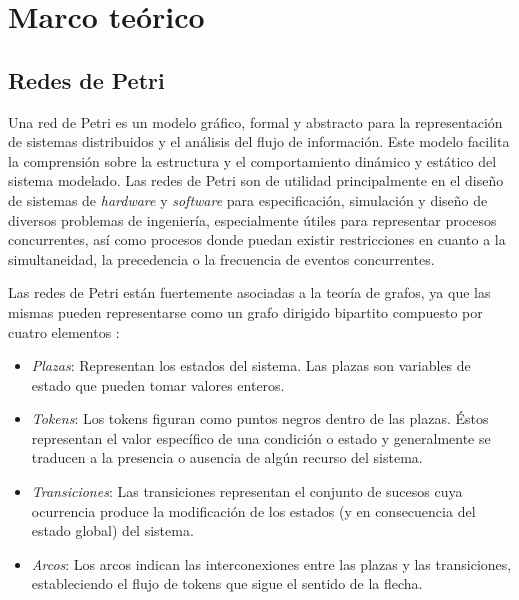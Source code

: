 \chapter{Marco teórico} %

\label{Chapter2} %

\section{Redes de Petri} \label{sec:rdp}

Una red de Petri es un modelo gráfico, formal y abstracto para la representación de sistemas distribuidos y el análisis del flujo de información. Este modelo facilita la comprensión sobre la estructura y el comportamiento dinámico y estático del sistema modelado. Las redes de Petri son de utilidad principalmente en el diseño de sistemas de \textit{hardware} y \textit{software} para especificación, simulación y diseño de diversos problemas de ingeniería, especialmente útiles para representar procesos concurrentes, así como procesos donde puedan existir restricciones en cuanto a la simultaneidad, la precedencia o la frecuencia de eventos concurrentes. \cite{brams}

Las redes de Petri están fuertemente asociadas a la teoría de grafos, ya que las mismas pueden representarse como un grafo dirigido bipartito compuesto por cuatro elementos \cite{libropopn}:
\begin{itemize}
    \item \textit{Plazas}: Representan los estados del sistema. Las plazas son variables de estado que pueden tomar valores enteros.
    \item \textit{Tokens}: Los tokens figuran como puntos negros dentro de las plazas. Éstos representan el valor específico de una condición o estado y generalmente se traducen a la presencia o ausencia de algún recurso del sistema.
    \item \textit{Transiciones}: Las transiciones representan el conjunto de sucesos cuya ocurrencia produce la modificación de los estados (y en consecuencia del estado global) del sistema.
    \item \textit{Arcos}: Los arcos indican las interconexiones entre las plazas y las transiciones, estableciendo el flujo de tokens que sigue el sentido de la flecha.
\end{itemize}

